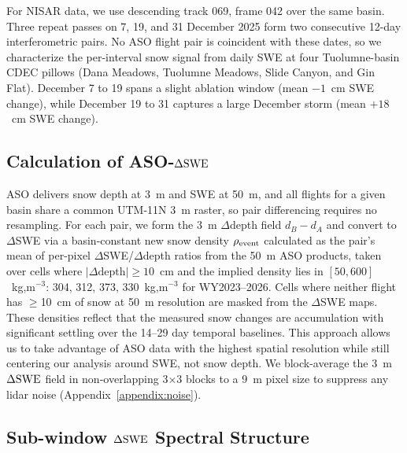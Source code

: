 \documentclass[journal abbreviation, manuscript]{copernicus}
\begin{document}
For NISAR data, we use descending track 069, frame 042 over the same basin. Three repeat passes on 7, 19, and 31 December 2025 form two consecutive 12-day interferometric pairs. No ASO flight pair is coincident with these dates, so we characterize the per-interval snow signal from daily SWE at four Tuolumne-basin CDEC pillows (Dana Meadows, Tuolumne Meadows, Slide Canyon, and Gin Flat). December 7 to 19 spans a slight ablation window (mean $-1$~cm SWE change), while December 19 to 31 captures a large December storm (mean $+18$~cm SWE change).

\subsection{Calculation of ASO-$\Delta\mathrm{SWE}$}\label{subsec:aso-phase}

ASO delivers snow depth at 3~m and SWE at 50~m, and all flights for a given basin share a common UTM-11N 3~m raster, so pair differencing requires no resampling. For each pair, we form the 3~m $\Delta$depth field $d_B - d_A$ and convert to $\Delta$SWE via a basin-constant new snow density $\rho_{\rm event}$ calculated as the pair's mean of per-pixel $\Delta$SWE/$\Delta$depth ratios from the 50~m ASO products, taken over cells where $|\Delta\text{depth}|\geq10$~cm and the implied density lies in $[50, 600]$~kg,m$^{-3}$: 304, 312, 373, 330~kg,m$^{-3}$ for WY2023--2026. Cells where neither flight has $\geq$10~cm of snow at 50~m resolution are masked from the $\Delta$SWE maps. These densities reflect that the measured snow changes are accumulation with significant settling over the 14--29 day temporal baselines. This approach allows us to take advantage of ASO data with the highest spatial resolution while still centering our analysis around SWE, not snow depth. We block-average the 3~m $\Delta\mathrm{SWE}$ field in non-overlapping 3$\times$3 blocks to a 9~m pixel size to suppress any lidar noise (Appendix~\ref{appendix:noise}).

\subsection{Sub-window $\Delta\mathrm{SWE}$ Spectral Structure}\label{subsec:psd}
\end{document}
